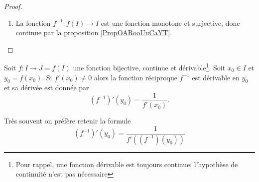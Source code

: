 \begin{proof}
\begin{enumerate}
\item

    La fonction \( f^{-1}\colon f(I)\to I\) est une fonction monotone et surjective, donc continue par la proposition \ref{PropOARooUuCaYT}.
  

    \end{enumerate}
\end{proof}

\begin{proposition} \label{PropMRBooXnnDLq}
    Soit \( f\colon I\to J=f(I)\) une fonction bijective, continue et dérivable\footnote{Pour rappel, une fonction dérivable est toujours continue; l'hypothèse de continuité n'est pas nécessaire}. Soit \( x_0\in I\) et \( y_0=f(x_0)\). Si \( f'(x_0)\neq 0\) alors la fonction réciproque \( f^{-1}\) est dérivable en \( y_0\) et sa dérivée est donnée par
    \begin{equation}    
        (f^{-1})'(y_0)=\frac{1}{ f'(x_0) }.
    \end{equation}
\end{proposition}
 
  \begin{Aretenir}
 Très souvent on préfère retenir la formule
    \begin{equation}\label{EqWWAooBRFNsv}
      (f^{-1})'(y_0) = \frac{1}{f'\left((f^{-1})(y_0)\right)}
    \end{equation}
  \end{Aretenir}


